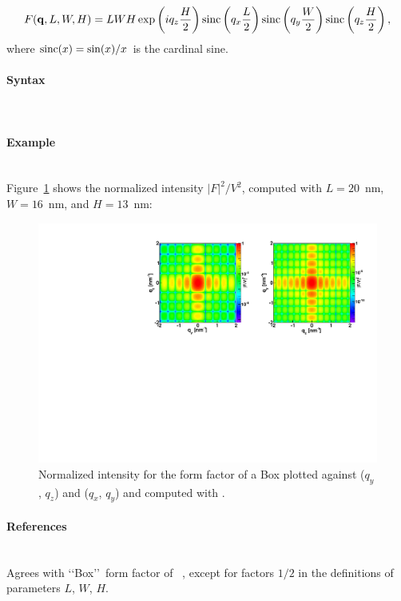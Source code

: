 \begin{equation*}
F(\mathbf{q},L,W,H)= L W H\exp\left(i q_z \frac{H}{2}\right) \operatorname{sinc}\left(q_x \frac{L}{2}\right)
\operatorname{sinc}\left(q_y \frac{W}{2}\right) \operatorname{sinc}\left(q_z \frac{H}{2}\right),
\end{equation*}
where $\operatorname{sinc}(x)=\sin(x)/x$ is the cardinal sine.

\paragraph{Syntax}\strut\\

\newpage

\paragraph{Example}\strut\\
Figure~\ref{fig:FFBoxEx} shows the normalized intensity
$|F|^2/V^2$, computed with $L=20$~nm, $W=16$~nm, and $H=13$~nm:

\begin{figure}[ht]
\begin{center}
\includegraphics[angle=-90,width=\textwidth]{fig/ff/figffbox.pdf}
\end{center}
\caption{Normalized intensity for the form factor of a Box plotted against ($q_y$, $q_z$) and  ($q_x$, $q_y$) and computed with .}
\label{fig:FFBoxEx}
\end{figure}

\paragraph{References}\strut\\
Agrees with \lq\lq Box\rq\rq\ form factor of \IsGISAXS~\cite{Laz02},
except for factors $1/2$ in the definitions of parameters $L$, $W$, $H$.

